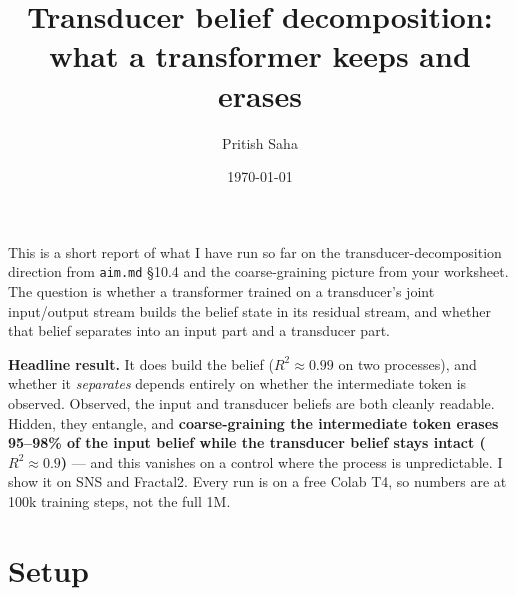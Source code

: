 \documentclass[11pt]{article}
\title{\vspace{-1.5em}Transducer belief decomposition: what a transformer keeps and erases}
\author{Pritish Saha}
\date{\today}
\begin{document}
\maketitle
\vspace{-1.5em}

\noindent
This is a short report of what I have run so far on the transducer-decomposition direction from
\texttt{aim.md} \S10.4 and the coarse-graining picture from your worksheet. The question is whether
a transformer trained on a transducer's joint input/output stream builds the belief state in its
residual stream, and whether that belief separates into an input part and a transducer part.

\textbf{Headline result.} It does build the belief ($R^2\approx0.99$ on two processes), and whether
it \emph{separates} depends entirely on whether the intermediate token is observed. Observed, the
input and transducer beliefs are both cleanly readable. Hidden, they entangle, and
\textbf{coarse-graining the intermediate token erases 95--98\% of the input belief while the
transducer belief stays intact ($R^2\approx0.9$)} --- and this vanishes on a control where the
process is unpredictable. I show it on SNS and Fractal2. Every run is on a free Colab T4, so numbers
are at 100k training steps, not the full 1M.

\begin{center}
\end{center}

\section{Setup}
\end{document}
